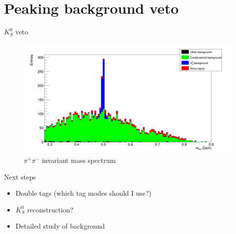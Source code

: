 \documentclass{beamer}
\begin{document}
\section{Peaking background veto}
\begin{frame}{$K_S^0$ veto}
  \begin{figure}
    \centering
    \includegraphics[width=\textwidth]{Mpipi_Composition.png}
    \caption{$\pi^+\pi^-$ invariant mass spectrum}
  \end{figure}
\end{frame}

\begin{frame}{Next steps}
  \begin{itemize}
    \item{Double tags (which tag modes should I use?)}
    \item{$K_S^0$ reconstruction?}
    \item{Detailed study of background}
  \end{itemize}
\end{frame}
\end{document}
